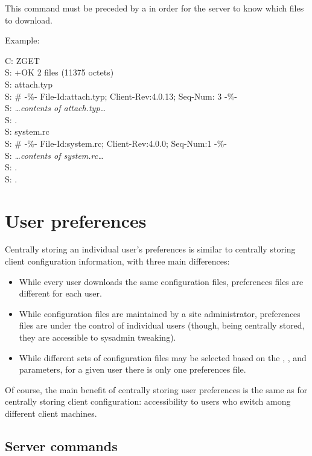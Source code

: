\begin{codelist}
This command must be preceded by a  in order for the server
to know which files to download.

Example:

\begin{conversation}
C: ZGET \\
S: +OK 2 files (11375 octets) \\
S: attach.typ \\
S: \# -\%- File-Id:attach.typ; Client-Rev:4.0.13; Seq-Num: 3 -\%- \\
S: {\it \ldots{}contents of attach.typ\ldots{}} \\
S: . \\
S: system.rc \\
S: \# -\%- File-Id:system.rc; Client-Rev:4.0.0; Seq-Num:1 -\%- \\
S: {\it \ldots{}contents of system.rc\ldots{}} \\
S: . \\
S: .
\end{conversation}
\end{codelist}

\section{User preferences}

Centrally storing an individual user's preferences is similar to
centrally storing client configuration information, with three main
differences:

\begin{itemize}
\item While every user downloads the same configuration files,
preferences files are different for each user.
\item While configuration files are maintained by a site
administrator, preferences files are under the control of individual
users (though, being centrally stored, they are accessible to sysadmin
tweaking).
\item While different sets of configuration files may be selected
based on the , , and 
parameters, for a given user there is only one preferences file.
\end{itemize}

Of course, the main benefit of centrally storing user preferences is
the same as for centrally storing client configuration: accessibility
to users who switch among different client machines.

\subsection{Server commands}

